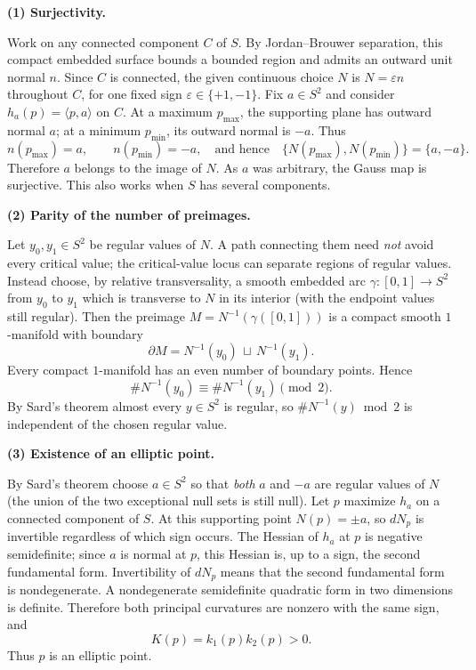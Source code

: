 \begin{solution}
\par\medskip\noindent\textbf{(1) Surjectivity.}\par\smallskip

	Work on any connected component $C$ of $S$. By Jordan--Brouwer separation, this
	compact embedded surface bounds a bounded region and admits an outward unit
	normal $n$. Since $C$ is connected, the given continuous choice $N$ is
	$N=\varepsilon n$ throughout $C$, for one fixed sign
	$\varepsilon\in\{+1,-1\}$.
	Fix $a\in S^2$ and consider $h_a(p)=\langle p,a\rangle$ on $C$.
	At a maximum $p_{\max}$, the supporting plane has outward normal $a$;
	at a minimum $p_{\min}$, its outward normal is $-a$. Thus
	\[
	n(p_{\max})=a,\qquad n(p_{\min})=-a,
	\quad\text{and hence}\quad
	\{N(p_{\max}),N(p_{\min})\}=\{a,-a\}.
	\]
	Therefore $a$ belongs to the image of $N$. As $a$ was arbitrary, the
	Gauss map is surjective. This also works when $S$ has several components.
	
	\par\medskip\noindent\textbf{(2) Parity of the number of preimages.}\par\smallskip

	Let $y_0,y_1\in S^2$ be regular values of $N$. A path connecting them
	need \emph{not} avoid every critical value; the critical-value locus can
	separate regions of regular values. Instead choose, by relative
	transversality, a smooth embedded arc
	$\gamma:[0,1]\to S^2$ from $y_0$ to $y_1$ which is transverse to
	$N$ in its interior (with the endpoint values still regular).
	Then the preimage $M=N^{-1}(\gamma([0,1]))$ is a compact smooth
	$1$-manifold with boundary
	\[
	\partial M=N^{-1}(y_0)\,\sqcup\,N^{-1}(y_1).
	\]
	Every compact $1$-manifold has an even number of boundary points. Hence
	\[
	\#N^{-1}(y_0)\equiv\#N^{-1}(y_1)\pmod 2.
	\]
	By Sard's theorem almost every $y\in S^2$ is regular, so
	$\#N^{-1}(y)\bmod 2$ is independent of the chosen regular value.
	
	\par\medskip\noindent\textbf{(3) Existence of an elliptic point.}\par\smallskip

	By Sard's theorem choose $a\in S^2$ so that \emph{both} $a$ and $-a$
	are regular values of $N$ (the union of the two exceptional null
	sets is still null). Let $p$ maximize $h_a$ on a connected component
	of $S$. At this supporting point $N(p)=\pm a$, so $dN_p$ is
	invertible regardless of which sign occurs.
	The Hessian of $h_a$ at $p$ is negative semidefinite; since $a$ is
	normal at $p$, this Hessian is, up to a sign, the second fundamental
	form. Invertibility of $dN_p$ means that the second fundamental form
	is nondegenerate. A nondegenerate semidefinite quadratic form in two
	dimensions is definite. Therefore both principal curvatures are
	nonzero with the same sign, and
	\[
	K(p)=k_1(p)k_2(p)>0.
	\]
	Thus $p$ is an elliptic point.
	

\end{solution}
